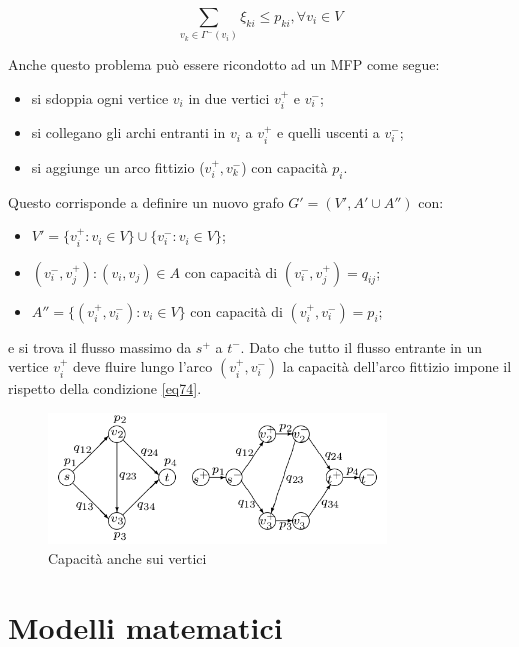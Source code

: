 \documentclass[11pt]{book}
\begin{document}
\begin{center}
\begin{equation}
\sum\limits_{v_k \in \Gamma^-(v_i)} \xi_{ki}\leq p_{ki}, \forall v_i
  \in V
\label{eq74}
\end{equation}
\end{center}

Anche questo problema pu\`o essere ricondotto ad un MFP come segue:

\begin{itemize}
\item si sdoppia ogni vertice $v_i$ in due vertici $v_i^+$ e $v_i^-$;
\item si collegano gli archi entranti in $v_i$ a $v_i^+$ e quelli
  uscenti a $v_i^-$;
\item si aggiunge un arco fittizio ($v_i^+, v_k^-$) con capacit\`a $p_i$.
\end{itemize}

Questo corrisponde a definire un nuovo grafo $G' = (V', A' \cup A'')$
con:

\begin{itemize}
\item $V' = \{ v_i^+ : v_i \in V\} \cup \{ v_i^- : v_i \in V\}$;
\item $(v_i^-, v_j^+) : (v_i,v_j) \in A$ con capacit\`a di $(v_i^-,
  v_j^+) = q_{ij}$;
\item $A'' = \{ (v_i^+,v_i^-) : v_i \in V\}$ con capacit\`a di
  $(v_i^+,v_i^-) = p_i$;
\end{itemize}

e si trova il flusso massimo da $s^+$ a $t^-$. Dato che tutto il
flusso entrante in un vertice $v_i^+$ deve fluire lungo l'arco
$(v_i^+, v_i^-)$ la capacit\`a dell'arco fittizio impone il rispetto
della condizione \ref{eq74}.

\begin{figure}[h!]
\centering
\includegraphics[width=0.8\textwidth]{images/cap7figura711.png}
\caption{Capacit\`a anche sui vertici}
\label{cap7figura711}
\end{figure}

\section{Modelli matematici}
\end{document}
